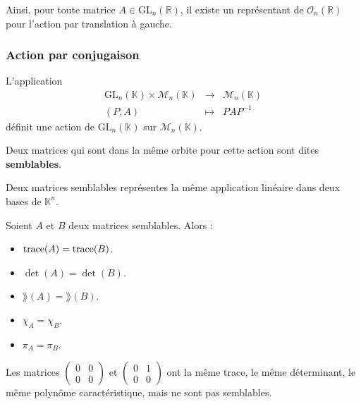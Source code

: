 	\begin{remark}
		Ainsi, pour toute matrice $A \in \mathrm{GL}_n(\mathbb{R})$, il existe un représentant de $\mathcal{O}_n(\mathbb{R})$ pour l'action par translation à gauche.
	\end{remark}
	
	\subsubsection{Action par conjugaison}
	
	
	\begin{proposition}
		L'application
		\[
			\begin{array}{ccc}
				\mathrm{GL}_n(\mathbb{K}) \times \mathcal{M}_n(\mathbb{K}) &\rightarrow& \mathcal{M}_n(\mathbb{K}) \\
				(P, A) &\mapsto& PAP^{-1}
			\end{array}
		\]
		définit une action de $\mathrm{GL}_n(\mathbb{K})$ sur $\mathcal{M}_n(\mathbb{K})$.
	\end{proposition}
	
	\begin{definition}
		Deux matrices qui sont dans la même orbite pour cette action sont dites \textbf{semblables}.
	\end{definition}
	
	
	\begin{remark}
		Deux matrices semblables représentes la même application linéaire dans deux bases de $\mathbb{K}^n$.
	\end{remark}
	
	
	\begin{theorem}
		Soient $A$ et $B$ deux matrices semblables. Alors :
		\begin{itemize}
			\item $\operatorname{trace}(A) = \operatorname{trace}(B)$.
			\item $\det(A) = \det(B)$.
			\item $\rang(A) = \rang(B)$.
			\item $\chi_A = \chi_B$.
			\item $\pi_A = \pi_B$.
		\end{itemize}
	\end{theorem}
	
	
	\begin{cexample}
		Les matrices $\begin{pmatrix} 0 & 0 \\ 0 & 0\end{pmatrix}$ et $\begin{pmatrix} 0 & 1 \\ 0 & 0\end{pmatrix}$ ont la même trace, le même déterminant, le même polynôme caractéristique, mais ne sont pas semblables.
	\end{cexample}
	
